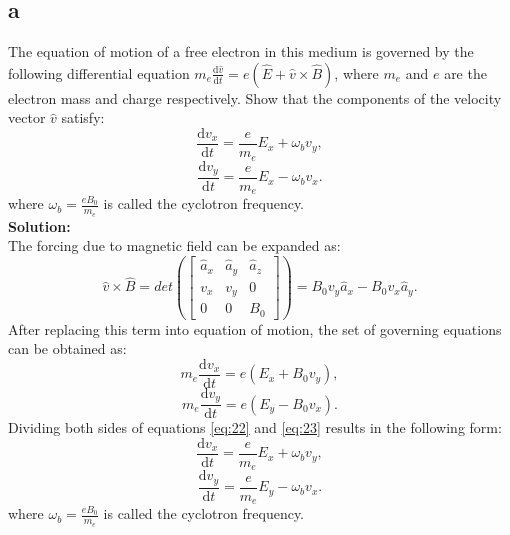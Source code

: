 \documentclass[11pt]{amsart}
\begin{document}
\subsection*{a}
The equation of motion of a free electron in this medium is governed by the following
differential equation $m_e \frac{\mathrm{d} \hat{v}}{\mathrm{d} t}=e(\hat{E}+\hat{v}\times \hat{B})$, where $m_e$ and $e$ are the electron mass and charge respectively. Show that the components of the velocity vector $\hat{v}$ satisfy:
\begin{equation*}
 \frac{\mathrm{d} v_x}{\mathrm{d} t}=\frac{e}{m_e} E_x+ \omega_b v_y,
\end{equation*}
\begin{equation*}
 \frac{\mathrm{d} v_y}{\mathrm{d} t}=\frac{e}{m_e} E_x - \omega_b v_x.
\end{equation*}
where $\omega_b=\frac{e B_0}{m_e}$ is called the cyclotron frequency.
\\
\textbf{Solution:}\\
The forcing due to magnetic field can be expanded as:
\begin{equation}
\label{eq:21}
\hat{v}\times \hat{B}=det(\begin{bmatrix}
\hat{a}_x & \hat{a}_y & \hat{a}_z \\ 
v_x &  v_y & 0 \\ 
0 & 0 & B_0
\end{bmatrix} )
=B_0 v_y \hat{a}_x - B_0 v_x \hat{a}_y.
\end{equation}
After replacing this term into equation of motion, the set of governing equations can be obtained as:
\begin{equation}
\label{eq:22}
m_e \frac{\mathrm{d} v_x}{\mathrm{d} t}=e (E_x+ B_0 v_y),
\end{equation}
\begin{equation}
\label{eq:23}
m_e \frac{\mathrm{d} v_y}{\mathrm{d} t}=e (E_y- B_0 v_x).
\end{equation}
Dividing both sides of equations \ref{eq:22} and \ref{eq:23} results in the following form:
\begin{equation}
\label{eq:24}
 \frac{\mathrm{d} v_x}{\mathrm{d} t}=\frac{e}{m_e} E_x+ \omega_b v_y,
\end{equation}
\begin{equation}
\label{eq:25}
 \frac{\mathrm{d} v_y}{\mathrm{d} t}=\frac{e}{m_e} E_y - \omega_b v_x.
\end{equation}
where $\omega_b=\frac{e B_0}{m_e}$ is called the cyclotron frequency.
\end{document}
